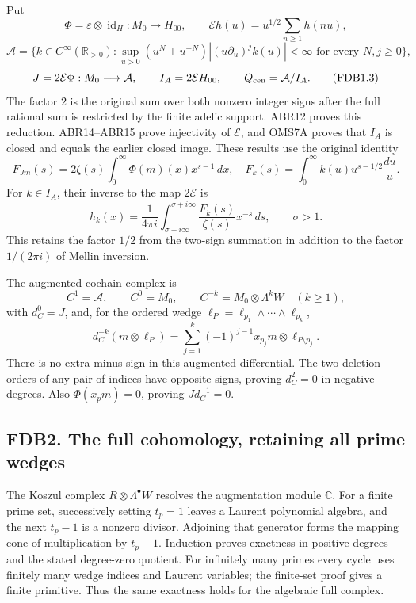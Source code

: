 Put \[
\Phi=\varepsilon\otimes\operatorname{id}_H:M_0\longrightarrow H_{00},
\qquad \mathcal E h(u)=u^{1/2}\sum_{n\ge1}h(nu),
\] \[
\mathcal A=\{k\in C^\infty(\mathbb R_{>0}):
\sup_{u>0}(u^N+u^{-N})|(u\partial_u)^jk(u)|<\infty
\text{ for every }N,j\ge0\},
\] \[
J=2\mathcal E\Phi:M_0\longrightarrow\mathcal A,
\qquad I_A=2\mathcal E H_{00},\qquad
Q_{\rm cen}=\mathcal A/I_A.
\tag{FDB1.3}
\] The factor \(2\) is the original sum over both nonzero integer signs
after the full rational sum is restricted by the finite adelic support.
ABR12 proves this reduction. ABR14--ABR15 prove injectivity of
\(\mathcal E\), and OMS7A proves that \(I_A\) is closed and equals the
earlier closed image. These results use the original identity \[
F_{Jm}(s)=2\zeta(s)\int_0^\infty\Phi(m)(x)x^{s-1}\,dx,
\quad
F_k(s)=\int_0^\infty k(u)u^{s-1/2}\frac{du}{u}.
\tag{FDB1.4}
\] For \(k\in I_A\), their inverse to the map \(2\mathcal E\) is \[
h_k(x)=\frac1{4\pi i}\int_{\sigma-i\infty}^{\sigma+i\infty}
\frac{F_k(s)}{\zeta(s)}x^{-s}\,ds,\qquad \sigma>1.
\tag{FDB1.5}
\] This retains the factor \(1/2\) from the two-sign summation in
addition to the factor \(1/(2\pi i)\) of Mellin inversion.

The augmented cochain complex is \[
C^1=\mathcal A,\qquad C^0=M_0,\qquad
C^{-k}=M_0\otimes\Lambda^kW\quad(k\ge1),
\tag{FDB1.6}
\] with \(d_C^0=J\), and, for the ordered wedge
\(\ell_P=\ell_{p_1}\wedge\cdots\wedge\ell_{p_k}\), \[
d_C^{-k}(m\otimes\ell_P)
=\sum_{j=1}^k(-1)^{j-1}x_{p_j}m\otimes\ell_{P\setminus p_j}.
\tag{FDB1.7}
\] There is no extra minus sign in this augmented differential. The two
deletion orders of any pair of indices have opposite signs, proving
\(d_C^2=0\) in negative degrees. Also \(\Phi(x_pm)=0\), proving
\(Jd_C^{-1}=0\).

\subsection{FDB2. The full cohomology, retaining all prime
wedges}\label{fdb2.-the-full-cohomology-retaining-all-prime-wedges}

The Koszul complex \(R\otimes\Lambda^\bullet W\) resolves the
augmentation module \(\mathbb C\). For a finite prime set, successively
setting \(t_p=1\) leaves a Laurent polynomial algebra, and the next
\(t_p-1\) is a nonzero divisor. Adjoining that generator forms the
mapping cone of multiplication by \(t_p-1\). Induction proves exactness
in positive degrees and the stated degree-zero quotient. For infinitely
many primes every cycle uses finitely many wedge indices and Laurent
variables; the finite-set proof gives a finite primitive. Thus the same
exactness holds for the algebraic full complex.

